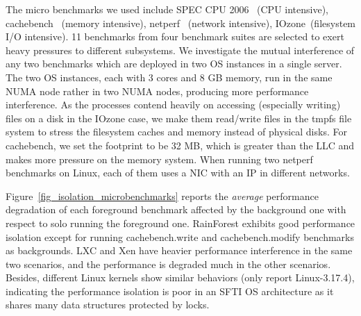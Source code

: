 \documentclass[pageno]{jpaper}
\begin{document}
The micro benchmarks we used include SPEC CPU 2006~\cite{henning:2006:speccpu} (CPU intensive), cachebench~\cite{Mucci:1998:cachebench} (memory intensive), netperf~\cite{jones:1996:netperf} (network intensive), IOzone~\cite{iozone_site}(filesystem I/O intensive). 11 benchmarks from four benchmark suites are selected to exert heavy pressures to different subsystems. We investigate the mutual interference of any two benchmarks which are deployed in two OS instances in a single server. The two OS instances, each with 3 cores and 8 GB memory, run in the same NUMA node rather in two NUMA nodes, producing more performance interference. As the processes contend heavily on accessing (especially writing) files on a disk in the IOzone case, we make them read/write files in the tmpfs file system to stress the filesystem caches and memory instead of physical disks. For cachebench, we set the footprint to be 32 MB, which is greater than the LLC and makes more pressure on the memory system. When running two netperf benchmarks on Linux, each of them uses a NIC with an IP in different networks.

Figure~\ref{fig_isolation_microbenchmarks} reports the \emph{average} performance degradation of each foreground benchmark affected by the background one with respect to solo running the foreground one. RainForest exhibits good performance isolation except for running cachebench.write and cachebench.modify benchmarks as backgrounds. LXC and Xen have heavier performance interference in the same two scenarios, and the performance is degraded much in the other scenarios. Besides, different Linux kernels show similar behaviors (only report Linux-3.17.4), indicating the performance isolation is poor in an SFTI OS architecture as it shares many data structures  protected by locks.




\begin{figure*}[t]
\setlength{\abovecaptionskip}{3pt}
\setlength{\belowcaptionskip}{0pt}
\centering
{}
    \caption{Performance degradation of co-running two benchmarks on a single server. Numbers 0$\sim$10 on the both \emph{x-} and \emph{y-} axes denotes \emph{SPECCPU.\{bzip2, sphix3\}}, \emph{cachebench.\{read, write, modify\}}, \emph{IOzone.\{write, read, modify\}}, \emph{netperf.\{tcp\_stream, tcp\_rr, tcp\_crr\}}, respectively. The numbers in the grid are the average performance slow down percentages (\%) when a foreground benchmark on y-axis interfered by a background one on x-axis relative to solo-running a foreground one.}
    \label{fig_isolation_microbenchmarks}
\end{figure*}
\end{document}
